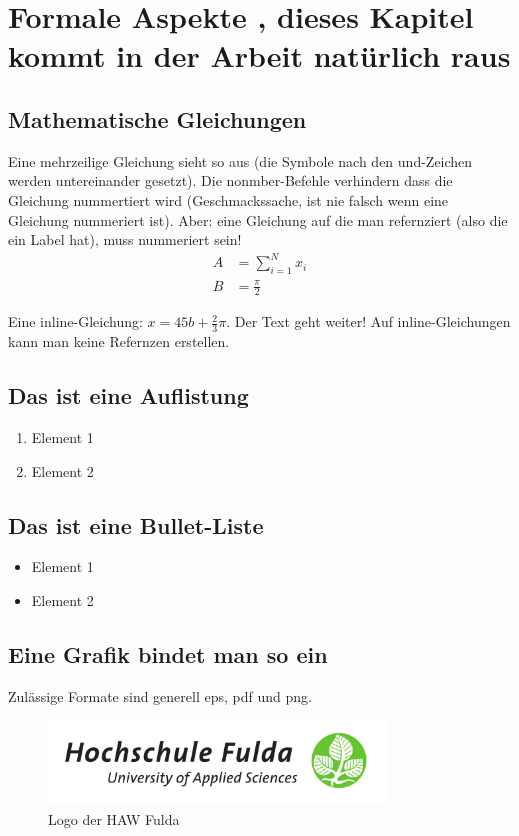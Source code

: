 \documentclass[12pt,oneside]{article}
\begin{document}
\section{Formale Aspekte , dieses Kapitel kommt in der Arbeit natürlich raus}
%
\subsection{Mathematische Gleichungen}
Eine mehrzeilige Gleichung sieht so aus (die Symbole nach den und-Zeichen werden untereinander gesetzt). Die nonmber-Befehle verhindern dass die Gleichung nummertiert wird (Geschmackssache, ist nie falsch wenn eine Gleichung nummeriert ist). Aber: eine Gleichung auf die man refernziert (also die ein Label hat), muss nummeriert sein!
\begin{align}
    A &= \sum_{i=1}^N x_i \label{eq:1}\nonumber\\
    B &= \frac{\pi}{2}
\end{align}

Eine inline-Gleichung: $x=45b + \frac{2}{3}\pi$. Der Text geht weiter! Auf inline-Gleichungen kann man keine Refernzen erstellen.

\subsection{Das ist eine Auflistung}
\begin{enumerate}
\item Element 1
\item Element 2
\end{enumerate}

\subsection{Das ist eine Bullet-Liste}
\begin{itemize}
\item Element 1
\item Element 2
\end{itemize}


\subsection{Eine Grafik bindet man so ein}
Zulässige Formate sind generell eps, pdf und png.
\begin{figure}[h]
    \centering
    \includegraphics[width=0.8\textwidth]{logo.pdf}
    \caption{Logo der HAW Fulda}
    \label{fig:bildchen}
\end{figure}
\end{document}
